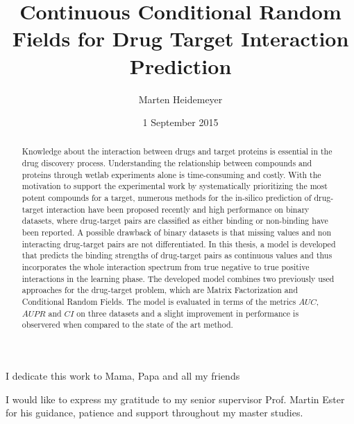 \documentclass{sfuthesis}
\title{Continuous Conditional Random Fields for Drug Target Interaction Prediction}
\author{Marten Heidemeyer}
\date{1 September 2015}
\begin{document}
\doublespacing
\large{
\frontmatter
\maketitle{}
\makecommittee{}

\begin{abstract}
Knowledge about the interaction between drugs and target proteins is essential in the drug discovery process.
Understanding the relationship between compounds and proteins through wetlab experiments alone is time-consuming and costly. With the motivation to support the experimental work by systematically prioritizing the most potent compounds for a target, numerous methods for the in-silico prediction of drug-target interaction have been proposed recently and high performance on binary datasets, where drug-target pairs are classified as either binding or non-binding have been reported. A possible drawback of binary datasets is that missing values and non interacting drug-target pairs are not differentiated. In this thesis, a model is developed that predicts the binding strengths of drug-target pairs as continuous values and thus incorporates the whole interaction spectrum from true negative to true positive interactions in the learning phase. The developed model combines two previously used approaches for the drug-target problem, which are Matrix Factorization and Conditional Random Fields. The model is evaluated in terms of the metrics $AUC$, $AUPR$ and $CI$ on three datasets and a slight improvement in performance is observered when compared to the state of the art method.
\end{abstract}

\begin{dedication} %
I dedicate this work to Mama, Papa and all my friends
\end{dedication}

\begin{acknowledgements} %
I would like to express my gratitude to my senior supervisor Prof. Martin Ester for his guidance, patience and support throughout my master studies. 
\end{acknowledgements}

\tableofcontents\clearpage
{}\listoftables\clearpage
{}\listoffigures
%
%

}
\end{document}
